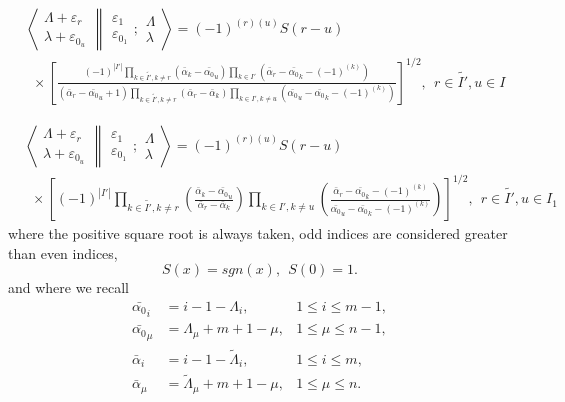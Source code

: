 \documentclass[12pt]{article}
\def\nn{\nonumber}
\begin{document}
\begin{align}
& \left\langle
\begin{array}{c} \Lambda+\varepsilon_r\\ \lambda+\varepsilon_{0_u} 
 \end{array}
\right\rVert
\left.
\begin{array}{c} \varepsilon_1 \\ \varepsilon_{0_1} 
 \end{array}
; \begin{array}{c} \Lambda \\ \lambda
 \end{array}
\right\rangle = (-1)^{(r)(u)} S(r-u) \nn\\
&~~\times 
\left[ 
\frac{
(-1)^{|I'|} \prod_{k\in\tilde{I'},k \neq r} \left(\bar{\alpha}_k - \bar{\alpha_0}_u \right)
\prod_{k\in I'} \left(\bar{\alpha}_r - \bar{\alpha_0}_k - (-1)^{(k)}\right) 
}
{
(\bar{\alpha}_r-\bar{\alpha_0}_u + 1)
\prod_{k\in \tilde{I'},k\neq r} \left(\bar{\alpha}_r - \bar{\alpha}_k \right)
\prod_{k\in I',k\neq u} \left(\bar{\alpha_0}_u - \bar{\alpha_0}_k - (-1)^{(k)}\right)
}
\right]^{1/2}
, \ \ r\in \tilde{I'},u\in I   \label{FinalBarredEven}
\end{align}


\begin{align}
& \left\langle
\begin{array}{c} \Lambda+\varepsilon_r\\ \lambda+\varepsilon_{0_u} 
 \end{array}
\right\rVert
\left.
\begin{array}{c} \varepsilon_1 \\ \varepsilon_{0_1} 
 \end{array}
; \begin{array}{c} \Lambda \\ \lambda
 \end{array}
\right\rangle = (-1)^{(r)(u)} S(r-u) \nn\\
&~~\times \left[ (-1)^{|I'|} \prod_{k\in \tilde{I'},k\neq r} 
\left(
\frac 
{\bar{\alpha}_k - \bar{\alpha_0}_u  }
{\bar{\alpha}_r - \bar{\alpha}_k }
\right)
\prod_{k\in I',k \neq u} 
\left(
\frac
{ \bar{\alpha}_r - \bar{\alpha_0}_k - (-1)^{(k)} }
{\bar{\alpha_0}_u - \bar{\alpha_0}_k - (-1)^{(k)} }
\right)
\right]^{1/2}
,\ \ r\in \tilde{I'},u\in I_1 \label{FinalBarredOdd}
\end{align}
where the positive square root is always taken, odd indices are considered greater than even indices, 
$$
S(x) = sgn(x),~~S(0)=1.
$$
and where we recall
\begin{align*}
{\bar{\alpha_0}}_i &= i - 1 -\Lambda_i  , &1\leq i\leq m-1, \\
{\bar{\alpha_0}}_\mu &= \Lambda_\mu + m + 1 - \mu  ,  &1\leq \mu \leq n-1 , \\ 
\bar{\alpha}_i  &= i - 1 -{\tilde{\Lambda}}_i , &1\leq i\leq m, \\
\bar{\alpha}_\mu &= {\tilde{\Lambda}}_\mu + m + 1 - \mu,  &1\leq \mu \leq n .  
\end{align*}
\end{document}
